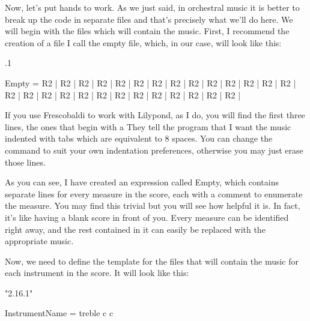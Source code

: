 \documentclass[../../LilyPond-Tutorials]{subfiles}
\begin{document}
Now, let's put hands to work.
As we just said, in orchestral music it is better to break up the code in separate files and that's precisely what we'll do here.
We will begin with the files which will contain the music.
First, I recommend the creation of a file I call the empty file, which, in our case, will look like this:

\begin{lilypondcode}
.1 %



Empty = {
	R2 | %
	R2 | %
	R2 | %
	R2 | %
	R2 | %
	R2 | %
	R2 | %
	R2 | %
	R2 | %
	R2 | %
	R2 | %
	R2 | %
	R2 | %
	R2 | %
	R2 | %
	R2 | %
	R2 | %
	R2 | %
	R2 | %
	R2 | %
	R2 | %
	R2 | %
	R2 | %
	R2 | %
	R2 | %
	R2 | %
	R2 | %
}
\end{lilypondcode}


If you use Frescobaldi to work with Lilypond, as I do, you will find the first three lines, the ones that begin with a %
They tell the program that I want the music indented with tabs which are equivalent to 8 spaces.
You can change the command to suit your own indentation preferences, otherwise you may just erase those lines.

As you can see, I have created an expression called Empty, which contains separate lines for every measure in the score, each with a comment to enumerate the measure. 
You may find this trivial but you will see how helpful it is.
In fact, it's like having a blank score in front of you.
Every measure can be identified right away, and the rest contained in it can easily be replaced with the appropriate music.

Now, we need to define the template for the files that will contain the music for each instrument in the score.
It will look like this:

\begin{lilypondcode}
\version "2.16.1"


InstrumentName = {
	\clef treble %
	\key c \major
	\relative c {
		\PersonalSettings
	}
}
\end{lilypondcode}
\end{document}
